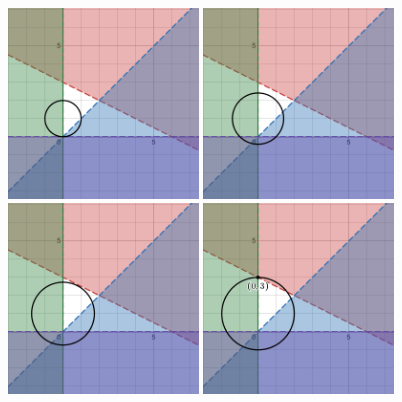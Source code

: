 \documentclass{article}
\begin{document}
\begin{enumerate}
\begin{figure}[htbp]
    \centering
    \includegraphics[width=0.45\textwidth]{figures/HW1_a-1.png}
    \includegraphics[width=0.45\textwidth]{figures/HW1_a-2.png}
    \includegraphics[width=0.45\textwidth]{figures/HW1_a-3.png}
    \includegraphics[width=0.45\textwidth]{figures/HW1_a-4.png}

\end{figure}
\end{enumerate}
\end{document}
